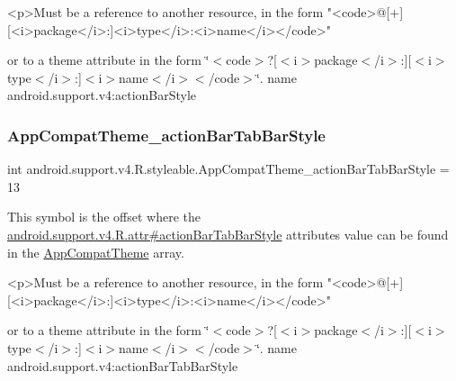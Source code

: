 \begin{DoxyVerb}      <p>Must be a reference to another resource, in the form "<code>@[+][<i>package</i>:]<i>type</i>:<i>name</i></code>"
\end{DoxyVerb}
 or to a theme attribute in the form \char`\"{}$<$code$>$?\mbox{[}$<$i$>$package$<$/i$>$\+:\mbox{]}\mbox{[}$<$i$>$type$<$/i$>$\+:\mbox{]}$<$i$>$name$<$/i$>$$<$/code$>$\char`\"{}.  name android.\+support.\+v4\+:action\+Bar\+Style \mbox{\label{classandroid_1_1support_1_1v4_1_1R_1_1styleable_a53ff434fe900f2e065169c843ae14dd4}} 
\subsubsection{\texorpdfstring{App\+Compat\+Theme\+\_\+action\+Bar\+Tab\+Bar\+Style}{AppCompatTheme\_actionBarTabBarStyle}}
{\footnotesize\ttfamily int android.\+support.\+v4.\+R.\+styleable.\+App\+Compat\+Theme\+\_\+action\+Bar\+Tab\+Bar\+Style = 13\hspace{0.3cm}{\ttfamily [static]}}

This symbol is the offset where the \hyperlink{classandroid_1_1support_1_1v4_1_1R_1_1attr_a958603508e58d4d05007fecfa875a0f0}{android.\+support.\+v4.\+R.\+attr\#action\+Bar\+Tab\+Bar\+Style} attribute\textquotesingle{}s value can be found in the \hyperlink{classandroid_1_1support_1_1v4_1_1R_1_1styleable_ac07ebbe62ed977f6dcaadc6397840ace}{App\+Compat\+Theme} array.

\begin{DoxyVerb}      <p>Must be a reference to another resource, in the form "<code>@[+][<i>package</i>:]<i>type</i>:<i>name</i></code>"
\end{DoxyVerb}
 or to a theme attribute in the form \char`\"{}$<$code$>$?\mbox{[}$<$i$>$package$<$/i$>$\+:\mbox{]}\mbox{[}$<$i$>$type$<$/i$>$\+:\mbox{]}$<$i$>$name$<$/i$>$$<$/code$>$\char`\"{}.  name android.\+support.\+v4\+:action\+Bar\+Tab\+Bar\+Style \mbox{\label{classandroid_1_1support_1_1v4_1_1R_1_1styleable_ace82d68d7bf21eba34ee1fc9395ad742}} 
